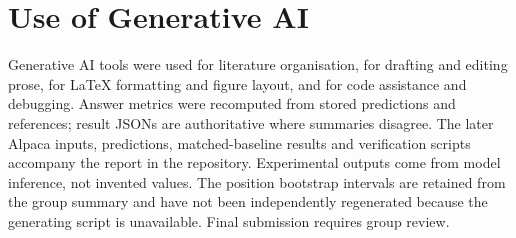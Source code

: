 \documentclass[10pt,a4paper,twocolumn]{article}
\begin{document}
\section{Use of Generative AI}

Generative AI tools were used for literature organisation, for drafting and
editing prose, for LaTeX formatting and figure layout, and for code assistance and
debugging. Answer metrics were recomputed from stored predictions and references; result JSONs are authoritative where summaries disagree. The later Alpaca inputs, predictions, matched-baseline results and verification scripts accompany the report in the repository. Experimental outputs come from model inference, not invented values. The position bootstrap intervals are retained from the group summary and have not been independently regenerated because the generating script is unavailable. Final submission requires group review.
\end{document}
